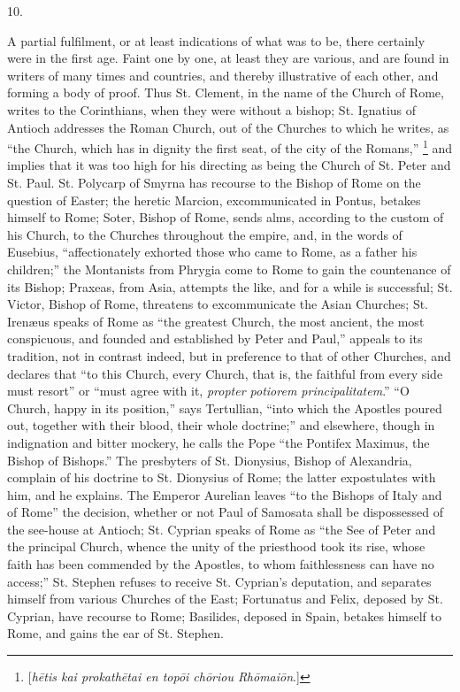 10.

A partial fulfilment, or at least indications of what
was to be, there certainly were in the first age. Faint
one by one, at least they are various, and are found in
writers of many times and countries, and thereby
illustrative of each other, and forming a body of proof.
Thus St. Clement, in the name of the Church of Rome,
writes to the Corinthians, when they were without a
bishop; St. Ignatius of Antioch addresses the Roman
Church, out of the Churches to which he writes, as
``the Church, which has in dignity the first seat, of
the city of the Romans,'' \footnote{[\emph{h\={e}tis
kai prokath\={e}tai en top\={o}i ch\={o}riou Rh\={o}mai\={o}n}.]} and implies that it was too
high for his directing as being the Church of St. Peter
and St. Paul. St. Polycarp of Smyrna has recourse to the
Bishop of Rome on the question of Easter; the heretic
Marcion, excommunicated in Pontus, betakes himself to
Rome; Soter, Bishop of Rome, sends alms, according to the
custom of his Church, to the Churches throughout the
empire, and, in the words of Eusebius,
``affectionately exhorted those who came to Rome, as
a father his children;'' the Montanists from Phrygia
come to Rome to gain the countenance of its Bishop;
Praxeas, from Asia, attempts the like, and for a while is
successful; St. Victor, Bishop of Rome, threatens to
excommunicate the Asian Churches; St. Irenæus speaks of
Rome as ``the greatest Church, the most ancient, the
most conspicuous, and founded and established by Peter
and Paul,'' appeals to its tradition, not in contrast
indeed, but in preference to that of other Churches, and
declares that ``to this Church, every Church, that
is, the faithful from every side must resort'' or
``must agree with it, \emph{propter potiorem
principalitatem}.'' ``O Church, happy in its
position,'' says Tertullian, ``into which the
Apostles poured out, together with their blood, their
whole doctrine;'' and elsewhere, though in
indignation and bitter mockery, he calls the Pope
``the Pontifex Maximus, the Bishop of Bishops.''
The presbyters of St. Dionysius, Bishop of Alexandria,
complain of his doctrine to St. Dionysius of Rome; the
latter expostulates with him, and he explains. The
Emperor Aurelian leaves ``to the Bishops of Italy and
of Rome'' the decision, whether or not Paul of
Samosata shall be dispossessed of the see-house at Antioch; St. Cyprian speaks of Rome as ``the See of
Peter and the principal Church, whence the unity of the
priesthood took its rise, whose faith has been commended
by the Apostles, to whom faithlessness can have no
access;'' St. Stephen refuses to receive St.
Cyprian's deputation, and separates himself from various
Churches of the East; Fortunatus and Felix, deposed by
St. Cyprian, have recourse to Rome; Basilides, deposed in
Spain, betakes himself to Rome, and gains the ear of St.
Stephen.

